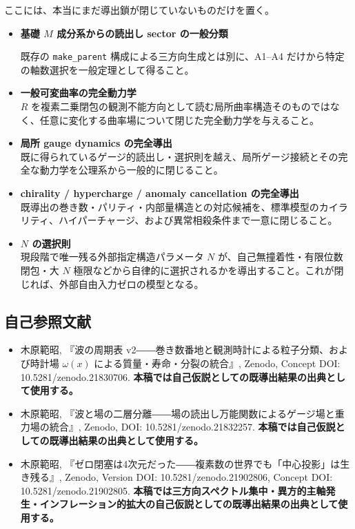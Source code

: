 \documentclass[
  a4paper,
]{ltjsarticle}
\providecommand{\tightlist}{%
  \setlength{\itemsep}{0pt}\setlength{\parskip}{0pt}}
\begin{document}
ここには、本当にまだ導出鎖が閉じていないものだけを置く。

\begin{itemize}
\item
  \textbf{基礎 \(M\) 成分系からの読出し sector の一般分類}

  既存の \texttt{make\_parent} 構成による三方向生成とは別に、A1--A4
  だけから特定の軸数選択を一般定理として得ること。
\item
  \textbf{一般可変曲率の完全動力学}\\
  \(R\)
  を複素二乗閉包の観測不能方向として読む局所曲率構造そのものではなく、任意に変化する曲率場について閉じた完全動力学を与えること。
\item
  \textbf{局所 gauge dynamics の完全導出}\\
  既に得られているゲージ的読出し・選択則を越え、局所ゲージ接続とその完全な動力学を公理系から一般的に閉じること。
\item
  \textbf{chirality / hypercharge / anomaly cancellation の完全導出}\\
  既導出の巻き数・パリティ・内部量構造との対応候補を、標準模型のカイラリティ、ハイパーチャージ、および異常相殺条件まで一意に閉じること。
\item
  \textbf{\(N\) の選択則}\\
  現段階で唯一残る外部指定構造パラメータ \(N\)
  が、自己無撞着性・有限位数閉包・大 \(N\)
  極限などから自律的に選択されるかを導出すること。これが閉じれば、外部自由入力ゼロの模型となる。
\end{itemize}

\subsection{自己参照文献}\label{ux81eaux5df1ux53c2ux7167ux6587ux732e}

\begin{itemize}
\tightlist
\item
  木原範昭, 『波の周期表
  v2――巻き数番地と観測時計による粒子分類、および時計場 \(\omega(x)\)
  による質量・寿命・分裂の統合』, Zenodo, Concept DOI:
  10.5281/zenodo.21830706.
  \textbf{本稿では自己仮説としての既導出結果の出典として使用する。}
\item
  木原範昭,
  『波と場の二層分離――場の読出し万能関数によるゲージ場と重力場の統合』,
  Zenodo, DOI: 10.5281/zenodo.21832257.
  \textbf{本稿では自己仮説としての既導出結果の出典として使用する。}
\item
  木原範昭,
  『ゼロ閉塞は4次元だった――複素数の世界でも「中心投影」は生き残る』,
  Zenodo, Version DOI: 10.5281/zenodo.21902806, Concept DOI:
  10.5281/zenodo.21902805.
  \textbf{本稿では三方向スペクトル集中・異方的主軸発生・インフレーション的拡大の自己仮説としての既導出結果の出典として使用する。}
\end{itemize}
\end{document}
